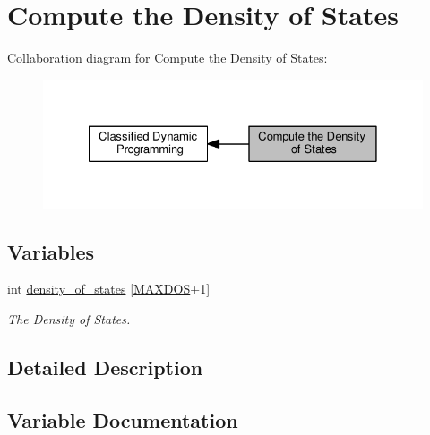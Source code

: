 \hypertarget{group__dos}{}\section{Compute the Density of States}
\label{group__dos}
Collaboration diagram for Compute the Density of States\+:
\nopagebreak
\begin{figure}[H]
\begin{center}
\leavevmode
\includegraphics[width=328pt]{group__dos}
\end{center}
\end{figure}
\subsection*{Variables}
\begin{DoxyCompactItemize}
\item 
int \hyperlink{group__dos_ga937634a76b46a22530a74906f1957a9e}{density\+\_\+of\+\_\+states} \mbox{[}\hyperlink{subopt_8h_a5ec740b80afb4906ba4311dbd8ddbd89}{M\+A\+X\+D\+O\+S}+1\mbox{]}
\begin{DoxyCompactList}\small\item\em The Density of States. \end{DoxyCompactList}\end{DoxyCompactItemize}


\subsection{Detailed Description}


\subsection{Variable Documentation}
\hypertarget{group__dos_ga937634a76b46a22530a74906f1957a9e}{}
